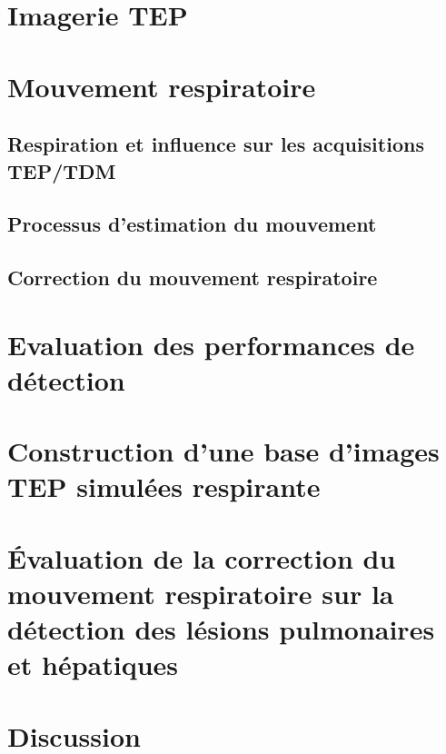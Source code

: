 \documentclass[12pt, a4paper]{book}
\begin{document}
 \listoftables

\newpage



\part{Imagerie TEP}
		
			
\part{Mouvement respiratoire}

	\chapter{Respiration et influence sur les acquisitions TEP/TDM}
	
	
	\chapter{Processus d'estimation du mouvement}
	
	
	\chapter{Correction du mouvement respiratoire}
	

\part{Evaluation des performances de détection}
	

	

\part{Construction d'une base d'images TEP simulées respirante}
	
	

\part{\'Evaluation de la correction du mouvement respiratoire sur la détection des lésions pulmonaires et hépatiques}
	

\part{Discussion}
	
\end{document}
